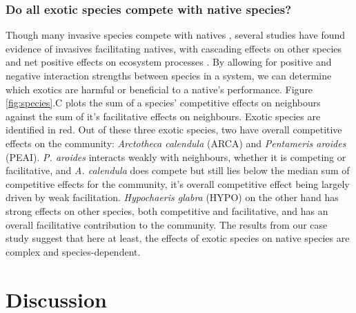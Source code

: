 \documentclass[a4,12pt]{article}
\begin{document}
\begin{refsection}
    \subsubsection*{Do all exotic species compete with native species?}
    Though many invasive species compete with natives \parencite{Naeem2000, Corbin2004, Riley2008, Zheng2015}, several studies have found evidence of invasives facilitating natives, with cascading effects on other species and net positive effects on ecosystem processes \parencite{Rodriguez2006, Ramus2017, Wainwright2019}. By allowing for positive and negative interaction strengths between species in a system, we can determine which exotics are harmful or beneficial to a native's performance. Figure \ref{fig:species}.C plots the sum of a species' competitive effects on neighbours against the sum of it's facilitative effects on neighbours. Exotic species are identified in red. Out of these three exotic species, two have overall competitive effects on the community: \textit{Arctotheca calendula} (ARCA) and \textit{Pentameris aroides} (PEAI). \textit{P. aroides} interacts weakly with neighbours, whether it is competing or facilitative, and \textit{A. calendula} does compete but still lies below the median sum of competitive effects for the community, it's overall competitive effect being largely driven by weak facilitation. \textit{Hypochaeris glabra} (HYPO) on the other hand has strong effects on other species, both competitive and facilitative, and has an overall facilitative contribution to the community. The results from our case study suggest that here at least, the effects of exotic species on native species are complex and species-dependent.


\section{Discussion}



\end{refsection}
\end{document}

